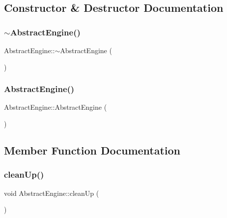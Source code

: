 \subsection{Constructor \& Destructor Documentation}
\hypertarget{class_ori_engine_1_1_abstract_engine_acb8473107540b7ed52eadce12bc69a81}{}\label{class_ori_engine_1_1_abstract_engine_acb8473107540b7ed52eadce12bc69a81} 
\subsubsection{\texorpdfstring{$\sim$\+Abstract\+Engine()}{~AbstractEngine()}}
{\footnotesize\ttfamily Abstract\+Engine\+::$\sim$\+Abstract\+Engine (\begin{DoxyParamCaption}{ }\end{DoxyParamCaption})}

\hypertarget{class_ori_engine_1_1_abstract_engine_aca590b0d9aa8d7f6b907b2ea575f52d8}{}\label{class_ori_engine_1_1_abstract_engine_aca590b0d9aa8d7f6b907b2ea575f52d8} 
\subsubsection{\texorpdfstring{Abstract\+Engine()}{AbstractEngine()}}
{\footnotesize\ttfamily Abstract\+Engine\+::\+Abstract\+Engine (\begin{DoxyParamCaption}{ }\end{DoxyParamCaption})}



\subsection{Member Function Documentation}
\hypertarget{class_ori_engine_1_1_abstract_engine_a8c77cd4669df9193d5283cf48bee3b94}{}\label{class_ori_engine_1_1_abstract_engine_a8c77cd4669df9193d5283cf48bee3b94} 
\subsubsection{\texorpdfstring{clean\+Up()}{cleanUp()}}
{\footnotesize\ttfamily void Abstract\+Engine\+::clean\+Up (\begin{DoxyParamCaption}{ }\end{DoxyParamCaption})}

